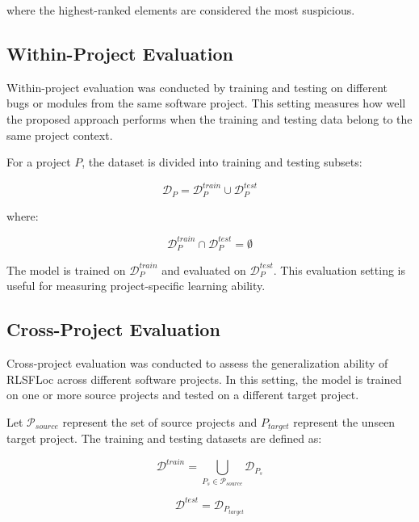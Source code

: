 \documentclass[article,article,submit,pdftex,moreauthors]{Definitions/mdpi}
\begin{document}
where the highest-ranked elements are considered the most suspicious.

\subsection{Within-Project Evaluation}

Within-project evaluation was conducted by training and testing on different bugs or modules from the same software project. This setting measures how well the proposed approach performs when the training and testing data belong to the same project context.

For a project $P$, the dataset is divided into training and testing subsets:

\begin{equation}
\mathcal{D}_{P} = \mathcal{D}_{P}^{train} \cup \mathcal{D}_{P}^{test}
\end{equation}

where:

\begin{equation}
\mathcal{D}_{P}^{train} \cap \mathcal{D}_{P}^{test} = \emptyset
\end{equation}

The model is trained on $\mathcal{D}_{P}^{train}$ and evaluated on $\mathcal{D}_{P}^{test}$. This evaluation setting is useful for measuring project-specific learning ability.

\subsection{Cross-Project Evaluation}

Cross-project evaluation was conducted to assess the generalization ability of RLSFLoc across different software projects. In this setting, the model is trained on one or more source projects and tested on a different target project.

Let $\mathcal{P}_{source}$ represent the set of source projects and $P_{target}$ represent the unseen target project. The training and testing datasets are defined as:

\begin{equation}
\mathcal{D}^{train} = \bigcup_{P_s \in \mathcal{P}_{source}} \mathcal{D}_{P_s}
\end{equation}

\begin{equation}
\mathcal{D}^{test} = \mathcal{D}_{P_{target}}
\end{equation}
\end{document}
